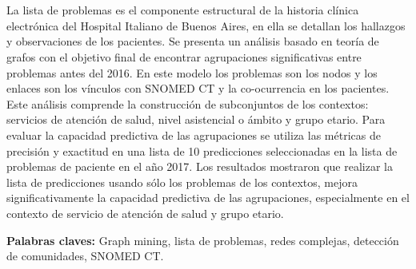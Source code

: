\chapter*{\runtitulo}

\noindent La lista de problemas es el componente estructural de la historia clínica electrónica del Hospital Italiano de Buenos Aires, en ella se detallan los hallazgos y observaciones de los pacientes. Se presenta un análisis basado en teoría de grafos con el objetivo final de encontrar agrupaciones significativas entre problemas antes del 2016. En este modelo los problemas son los nodos y los enlaces son los vínculos con SNOMED CT y la co-ocurrencia en los pacientes. Este análisis comprende la construcción de subconjuntos de los contextos: servicios de atención de salud, nivel asistencial o ámbito y grupo etario. Para evaluar la capacidad predictiva de las agrupaciones se utiliza las métricas de precisión y exactitud en una lista de 10 predicciones seleccionadas en la lista de problemas de paciente en el año 2017. Los resultados mostraron que realizar la lista de predicciones usando sólo los problemas de los contextos, mejora significativamente la capacidad predictiva de las agrupaciones, especialmente en el contexto de servicio de atención de salud y grupo etario.


\bigskip

\noindent\textbf{Palabras claves:} Graph mining, lista de problemas, redes complejas, detección de comunidades, SNOMED CT.